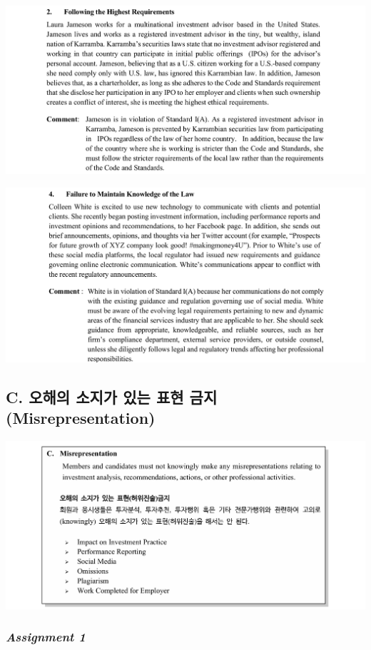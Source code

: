 \documentclass[
  a4paper,
  DIV=11,
  numbers=noendperiod]{scrreprt}
\begin{document}
\includegraphics{image/ethic1.png}

\includegraphics{image/ethic2.png}

\subsection*{C. 오해의 소지가 있는 표현 금지
(Misrepresentation)}\label{c.-uxc624uxd574uxc758-uxc18cuxc9c0uxac00-uxc788uxb294-uxd45cuxd604-uxae08uxc9c0-misrepresentation}

\includegraphics{image/ethic1C.png}

\subsubsection*{\texorpdfstring{\textbf{\emph{Assignment
1}}}{Assignment 1}}\label{assignment-1-1}
\end{document}
